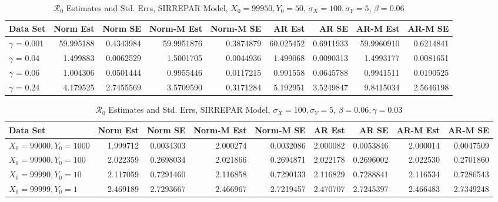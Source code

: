 \documentclass[12pt]{article}
\newcommand{\rr}{\ensuremath{\mathcal{R}_0}}
\begin{document}
\begin{table}[H]
	
	\caption{\label{tab:}$\rr$ Estimates and Std. Errs, SIRREPAR Model,
		$X_0 = 99950, Y_0 = 50$, $\sigma_X = 100, \sigma_Y = 5$, $\beta = 0.06$}
	\centering
	\begin{footnotesize}
		\begin{tabular}[t]{l|r|r|r|r|r|r|r|r}
			\hline
			Data Set & Norm Est & Norm SE & Norm-M Est & Norm-M SE & AR Est & AR SE & AR-M Est & AR-M SE\\
			\hline
			$\gamma$ = 0.001 & 59.995188 & 0.4343984 & 59.9951876 & 0.3874879 & 60.025452 & 0.6911933 & 59.9960910 & 0.6214841\\
			\hline
			$\gamma$ = 0.04 & 1.499883 & 0.0062529 & 1.5001705 & 0.0044936 & 1.499068 & 0.0090313 & 1.4993177 & 0.0081651\\
			\hline
			$\gamma$ = 0.06 & 1.004306 & 0.0501444 & 0.9955446 & 0.0117215 & 0.991558 & 0.0645788 & 0.9941511 & 0.0190525\\
			\hline
			$\gamma$ = 0.24 & 4.179525 & 2.7455569 & 3.5709590 & 0.3171284 & 5.192951 & 3.5249847 & 9.8415034 & 2.5646198\\
			\hline
		\end{tabular}
	\end{footnotesize}
\end{table}

\begin{table}[H]
	
	\caption{\label{tab:}$\rr$ Estimates and Std. Errs, SIRREPAR Model,
		$\sigma_X = 100, \sigma_Y = 5$, $\beta = 0.06, \gamma = 0.03$}
	\centering
	\begin{footnotesize}
		\begin{tabular}[t]{l|r|r|r|r|r|r|r|r}
			\hline
			Data Set & Norm Est & Norm SE & Norm-M Est & Norm-M SE & AR Est & AR SE & AR-M Est & AR-M SE\\
			\hline
			$X_0 = 99000, Y_0 = 1000$ & 1.999712 & 0.0034303 & 2.000274 & 0.0032086 & 2.000082 & 0.0053846 & 2.000014 & 0.0047509\\
			\hline
			$X_0 = 99900, Y_0 = 100$ & 2.022359 & 0.2698034 & 2.021866 & 0.2694871 & 2.022178 & 0.2696002 & 2.022530 & 0.2701860\\
			\hline
			$X_0 = 99990, Y_0 = 10$ & 2.117059 & 0.7291460 & 2.116858 & 0.7290133 & 2.116829 & 0.7288841 & 2.116534 & 0.7286543\\
			\hline
			$X_0 = 99999, Y_0 = 1$  & 2.469189 & 2.7293667 & 2.466967 & 2.7219457 & 2.470707 & 2.7245397 & 2.466483 & 2.7349248\\
			\hline
		\end{tabular}
	\end{footnotesize}
\end{table}
\end{document}
